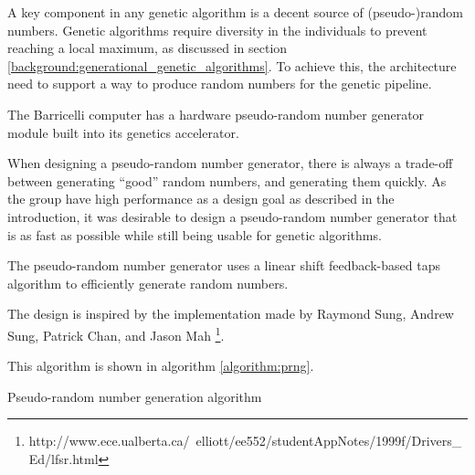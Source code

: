 A key component in any genetic algorithm is a decent source of (pseudo-)random numbers.
Genetic algorithms require diversity in the individuals to prevent reaching a local maximum, as discussed in section \ref{background:generational_genetic_algorithms}. 
To achieve this, the architecture need to support a way to produce random numbers for the genetic pipeline.   

The Barricelli computer has a hardware pseudo-random number generator module built into its genetics accelerator.

When designing a pseudo-random number generator, there is always a trade-off between generating ``good'' random numbers, and generating them quickly.
As the group have high performance as a design goal as described in the introduction, it was desirable to design a pseudo-random number generator that is as fast as possible while still being usable for genetic algorithms.

The pseudo-random number generator uses a linear shift feedback-based taps algorithm to efficiently generate random numbers.

The design is inspired by the implementation made by Raymond Sung, Andrew Sung, Patrick Chan, and Jason Mah \footnote{http://www.ece.ualberta.ca/~elliott/ee552/studentAppNotes/1999f/Drivers\_Ed/lfsr.html}. 

This algorithm is shown in algorithm \vref{algorithm:prng}.

\begin{algorithm}[H]
\SetAlgoLined
\DontPrintSemicolon
{}
\caption{Pseudo-random number generation algorithm}
\label{algorithm:prng}
\end{algorithm}

